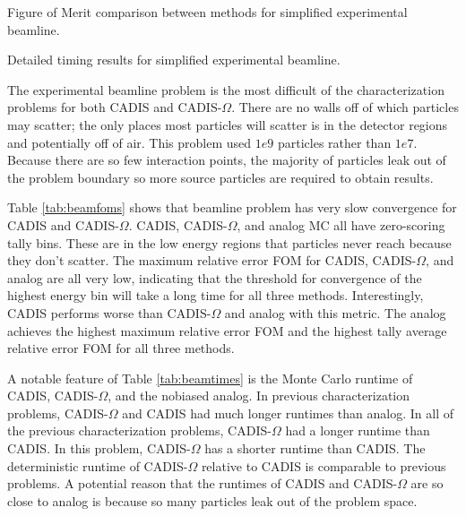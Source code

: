 \begin{table}[h!]
  \centering
  
  \caption[Figure of Merit comparison between methods for simplified
    experimental beamline.]
    {Figure of Merit comparison between methods for simplified experimental
    beamline.}
  \label{tab:beamfoms}
\end{table}

\begin{table}[h!]
  \centering
  
  \caption[Detailed timing results for simplified experimental
  beamline.]
  {Detailed timing results for simplified experimental beamline.}
  \label{tab:beamtimes}
\end{table}

The experimental beamline problem is the most
difficult of the characterization problems for both CADIS and CADIS-$\Omega$.
There are no walls off of which
particles may scatter; the only places most particles will scatter is in the
detector regions and potentially off of air. This problem used
 $1e9$ particles rather than $1e7$. Because there are so few interaction
points, the majority of particles leak out of the problem boundary so
more source particles are required to obtain results.

Table \ref{tab:beamfoms} shows that beamline
problem has very slow convergence for
CADIS and CADIS-$\Omega$. CADIS, CADIS-$\Omega$, and analog MC all have
zero-scoring tally bins. These are in the low energy regions that particles never reach because they don't scatter.
The maximum relative error FOM for CADIS, CADIS-$\Omega$,
and analog are all very low, indicating that the threshold for
convergence of the highest energy bin will take a long time for all three
methods. Interestingly, CADIS performs worse than CADIS-$\Omega$ and 
analog with this metric. The analog achieves the highest
maximum relative error FOM and the highest tally average relative error FOM for all
three methods.

A notable feature of Table \ref{tab:beamtimes} is the Monte Carlo runtime of
CADIS, CADIS-$\Omega$, and the nobiased analog. In previous characterization
problems, CADIS-$\Omega$ and CADIS had much longer runtimes than
analog. In all of the previous characterization problems, CADIS-$\Omega$ had a
longer runtime than CADIS. In this problem, CADIS-$\Omega$ has a shorter runtime
than CADIS. The deterministic runtime of CADIS-$\Omega$ relative to CADIS
is comparable to previous problems. A potential reason that the runtimes of
CADIS and CADIS-$\Omega$ are so close to analog is because so many
particles leak out of the problem space.

